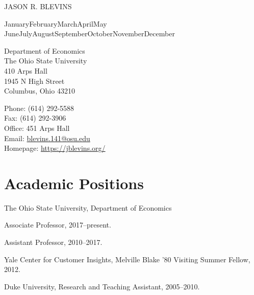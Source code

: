 \documentclass[10pt,letterpaper]{article}
\def\name{Jason R. Blevins}
\newcommand{\titlefont}[1]{{\titleface\large\MakeUppercase{#1}}}
\renewenvironment{itemize}{
  \begin{list}{}{
      \setlength{\leftmargin}{1.5em}
      \setlength{\itemsep}{0.25em}
      \setlength{\parskip}{0pt}
      \setlength{\parsep}{0.25em}
    }
}{
  \end{list}
}
\renewcommand{\today}{\ifcase \month \or January\or February\or March\or April\or May%
\or June\or July\or August\or September\or October\or November\or December\fi%
\space \number \year}
\begin{document}
\titlefont{\name}


\bigskip
\today

\bigskip
\begin{minipage}[t]{0.495\textwidth}
  Department of Economics \\
  The Ohio State University \\
  410 Arps Hall \\
  1945 N High Street \\
  Columbus, Ohio 43210
\end{minipage}
\begin{minipage}[t]{0.495\textwidth}
  Phone: (614) 292-5588 \\
  Fax: (614) 292-3906 \\
  Office: 451 Arps Hall \\
  Email: \href{mailto:blevins.141@osu.edu}{blevins.141@osu.edu} \\
  Homepage: \href{https://jblevins.org/}{https://jblevins.org/}
\end{minipage}

\section*{Academic Positions}

\begin{itemize}
\item The Ohio State University, Department of Economics
  \begin{itemize}
  \item Associate Professor, 2017--present.
  \item Assistant Professor, 2010--2017.
  \end{itemize}
\item Yale Center for Customer Insights,
  Melville Blake '80 Visiting Summer Fellow,
  2012.
\item Duke University,
  Research and Teaching Assistant,
  2005--2010.
\end{itemize}
\end{document}
